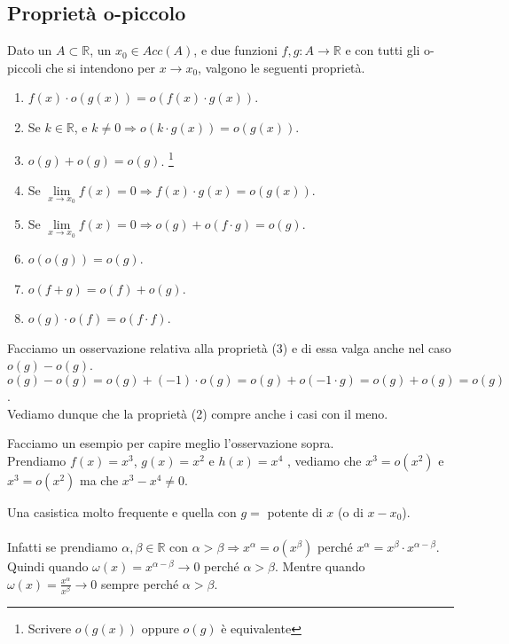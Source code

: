 \subsection{Proprietà o-piccolo}
Dato un $A \subset \mathbb{R}$, un $x_0 \in Acc(A)$, e due funzioni $f,g: A \to \mathbb{R}$ e con tutti gli o-piccoli che si intendono per $x\to x_0$, valgono le seguenti proprietà.
\begin{enumerate}
    \item $f(x) \cdot o(g(x)) = o(f(x) \cdot g(x))$.
    \item Se $k \in \mathbb{R}$, e $k \neq 0 \Longrightarrow o(k \cdot g(x)) = o(g(x))$.
    \item $o(g) + o(g) = o(g)$. \footnote{Scrivere $o(g(x))$ oppure $o(g)$ è equivalente}
    \item Se $\lim\limits_{x\to x_0}f(x) = 0 \Longrightarrow f(x) \cdot g(x) = o(g(x))$.
    \item Se $\lim\limits_{x\to x_0}f(x) = 0 \Longrightarrow o(g) + o(f \cdot g) = o(g)$.
    \item $o(o(g)) = o(g)$.
    \item $o(f + g) = o(f) + o(g)$.
    \item $o(g) \cdot o(f) = o(f \cdot f)$.
\end{enumerate}

\begin{observation}
Facciamo un osservazione relativa alla proprietà (3) e di essa valga anche nel caso $o(g) - o(g)$.\\
$o(g) - o(g) = o(g) + (-1)\cdot o(g) = o(g) + o(-1 \cdot g) = o(g) + o(g) = o(g)$. \\
Vediamo dunque che la proprietà (2) compre anche i casi con il meno.
\end{observation}

\begin{example}
Facciamo un esempio per capire meglio l'osservazione sopra. \\
Prendiamo $f(x) = x^3$, $g(x) = x^2$ e $h(x) = x^4$ , vediamo che $x^3 = o(x^2)$ e $x^3 = o(x^2)$ ma che $x^3 - x^4 \neq 0$.
\end{example}

\begin{observation}
Una casistica molto frequente e quella con $g = $ potente di $x$ (o di $x - x_0$).\\\\
Infatti se prendiamo $\alpha, \beta \in \mathbb{R}$ con $\alpha > \beta \Longrightarrow x^\alpha = o(x^\beta)$ perché $x^\alpha = x^\beta \cdot x^{\alpha - \beta}$.\\
Quindi quando $\omega(x) = x^{\alpha-\beta} \to 0$ perché $\alpha > \beta$.
Mentre quando $\omega(x) = \frac{x^\alpha}{x^\beta} \to 0$ sempre perché $\alpha > \beta$.
\end{observation}

